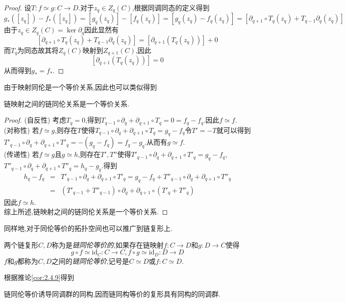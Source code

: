 \documentclass{article}
\begin{document}
\begin{proof}
    设$T : f \simeq g: C\to D$.对于$z_q \in Z_q(C)$,根据同调同态的定义得到
    $$
    g_*([z_q])-f_*([z_q]) = [g_q(z_q)] - [f_q(z_q)] = [g_q(z_q) - f_q(z_q)] = [\partial_{q+1} \circ T_q(z_q)+ T_{q-1}\partial_q (z_q)]
    $$
    由于$z_q \in Z_q(C) = \ker\partial_q$因此显然有
    $$
    [\partial_{q+1} \circ T_q(z_q)+ T_{q-1}\partial_q (z_q)] = [\partial_{q+1}(T_q(z_q))] +0
    $$
    而$T_q$为同态故其将$Z_q(C)$映射到$Z_{q+1}(C)$,因此
    $$
    [\partial_{q+1}(T_q(z_q))]  =0
    $$
    从而得到$g_* = f_*$.
\end{proof}
由于映射同伦是一个等价关系,因此也可以类似得到
\begin{proposition}
    链映射之间的链同伦关系是一个等价关系.
\end{proposition}
\begin{proof}
    (自反性) 考虑$T_q = 0$,得到$T_{q-1} \circ \partial_{q} + \partial_{q+1} \circ T_{q} = 0 = f_q - f_q$.因此$f \simeq f$.\\
    (对称性) 若$f \simeq g$,则存在$T$使得$T_{q-1} \circ \partial_{q} + \partial_{q+1} \circ T_{q} = g_q - f_q$令$T' = -T$就可以得到$T'_{q-1} \circ \partial_{q} + \partial_{q+1} \circ T'_{q} = -(g_q - f_q) = f_q - g_q$.从而有$g \simeq f$.\\
    (传递性) 若$f \simeq g$且$g \simeq h$,则存在$T',T''$使得$T'_{q-1} \circ \partial_{q} + \partial_{q+1} \circ T'_{q} = g_q - f_q$,$T''_{q-1} \circ \partial_{q} + \partial_{q+1} \circ T''_{q} = h_q - g_q$.得到
    \begin{eqnarray*}
    h_q - f_q &=& T'_{q-1} \circ \partial_{q} + \partial_{q+1} \circ T'_{q} = g_q - f_q+T''_{q-1} \circ \partial_{q} + \partial_{q+1} \circ T''_{q}\\
    &=& (T'_{q-1}+T''_{q-1})\circ \partial_q + \partial_{q+1} \circ (T'_q + T''_q)
    \end{eqnarray*}
    因此$f \simeq h$.\\
    综上所述,链映射之间的链同伦关系是一个等价关系.
\end{proof}
同样地,对于同伦等价的拓扑空间也可以推广到链复形上.
\begin{definition}
    两个链复形$C,D$称为是\emph{链同伦等价的},如果存在链映射$f : C \to D$和$g : D \to C$使得
    $$
    g \circ f \simeq \text{id}_{C}: C \to C , f \circ g \simeq \text{id}_D : D \to D
    $$
    $f$和$g$都称为$C,D$之间的\emph{链同伦等价},记号是$C \simeq D$或$f : C \simeq D$.
\end{definition}
根据推论\ref{cor:2.4.9}得到
\begin{proposition}
    链同伦等价诱导同调群的同构,因而链同构等价的复形具有同构的同调群.
\end{proposition}
\end{document}
